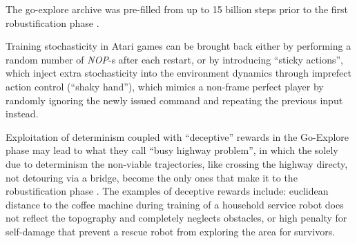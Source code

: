 \documentclass[acmsmall, nonacm]{acmart}
\begin{document}
The go-explore archive was pre-filled from up to 15 billion steps prior to the first
robustification phase \citep[p.~19]{ecoffet_first_2021}.

Training stochasticity in Atari games can be brought back either by performing a random
number of \emph{NOP}-s after each restart, or by introducing ``sticky actions'', which
inject extra stochasticity into the environment dynamics through imprefect action control
(``shaky hand''), which mimics a non-frame perfect player by randomly ignoring the newly
issued command and repeating the previous input instead.

Exploitation of determinism coupled with ``deceptive'' rewards in the Go-Explore phase
may lead to what they call ``busy highway problem'', in which the solely due to determinism
the non-viable trajectories, like crossing the highway directy, not detouring via a bridge,
become the only ones that make it to the robustification phase
\citep[p.~17]{ecoffet_go-explore_2021}.
% 
The examples of deceptive rewards include: euclidean distance to the coffee machine during
training of a household service robot does not reflect the topography and completely
neglects obstacles, or high penalty for self-damage that prevent a rescue robot from
exploring the area for survivors.

\end{document}
